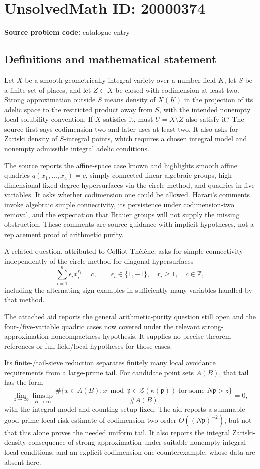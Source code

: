 \documentclass[11pt]{article}
\newcommand{\Z}{\mathbb{Z}}
\begin{document}
\section*{UnsolvedMath ID: 20000374}
\textbf{Source problem code:} catalogue entry
\subsection{Definitions and mathematical statement}
Let \(X\) be a smooth geometrically integral variety over a number field \(K\), let \(S\) be a finite set of places, and let \(Z\subset X\) be closed with codimension at least two. Strong approximation outside \(S\) means density of \(X(K)\) in the projection of its adelic space to the restricted product away from \(S\), with the intended nonempty local-solubility convention. If \(X\) satisfies it, must \(U=X\setminus Z\) also satisfy it? The source first says codimension two and later uses at least two. It also asks for Zariski density of \(S\)-integral points, which requires a chosen integral model and nonempty admissible integral adelic conditions.

The source reports the affine-space case known and highlights smooth affine quadrics \(q(x_1,\ldots,x_4)=c\), simply connected linear algebraic groups, high-dimensional fixed-degree hypersurfaces via the circle method, and quadrics in five variables. It asks whether codimension one could be allowed. Harari's comments invoke algebraic simple connectivity, its persistence under codimension-two removal, and the expectation that Brauer groups will not supply the missing obstruction. These comments are source guidance with implicit hypotheses, not a replacement proof of arithmetic purity.

A related question, attributed to Colliot-Th\'el\`ene, asks for simple connectivity independently of the circle method for diagonal hypersurfaces
\[
\sum_{i=1}^n\epsilon_i x_i^{r_i}=c,\qquad
\epsilon_i\in\{1,-1\},\quad r_i\geq1,\quad c\in\Z,
\]
including the alternating-sign examples in sufficiently many variables handled by that method.

The attached aid reports the general arithmetic-purity question still open and the four-/five-variable quadric cases now covered under the relevant strong-approximation noncompactness hypothesis. It supplies no precise theorem references or full field/local hypotheses for those cases.

Its finite-/tail-sieve reduction separates finitely many local avoidance requirements from a large-prime tail. For candidate point sets \(A(B)\), that tail has the form
\[
\lim_{z\to\infty}\limsup_{B\to\infty}
\frac{\#\{x\in A(B):x\bmod\mathfrak p\in\mathcal Z(\kappa(\mathfrak p))
\text{ for some }N\mathfrak p>z\}}{\#A(B)}=0,
\]
with the integral model and counting setup fixed. The aid reports a summable good-prime local-risk estimate of codimension-two order \(O((N\mathfrak p)^{-2})\), but not that this alone proves the needed uniform tail. It also reports the integral Zariski-density consequence of strong approximation under suitable nonempty integral local conditions, and an explicit codimension-one counterexample, whose data are absent here.
\end{document}
